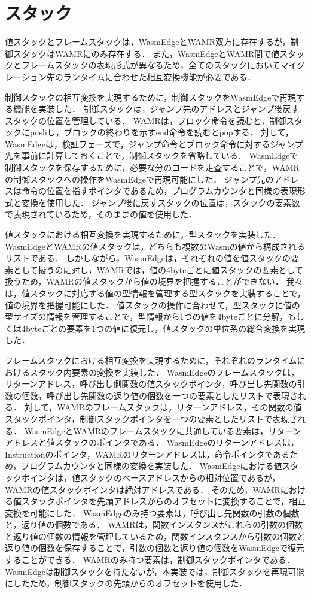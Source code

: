 \section{スタック}
値スタックとフレームスタックは，WasmEdgeとWAMR双方に存在するが，制御スタックはWAMRにのみ存在する．
また，WasmEdgeとWAMR間で値スタックとフレームスタックの表現形式が異なるため，全てのスタックにおいてマイグレーション先のランタイムに合わせた相互変換機能が必要である．

制御スタックの相互変換を実現するために，制御スタックをWasmEdgeで再現する機能を実装した．
制御スタックは，ジャンプ先のアドレスとジャンプ後戻すスタックの位置を管理している．
WAMRは，ブロック命令を読むと，制御スタックにpushし，ブロックの終わりを示すend命令を読むとpopする．
対して，WasmEdgeは，検証フェーズで，ジャンプ命令とブロック命令に対するジャンプ先を事前に計算しておくことで，制御スタックを省略している．
WasmEdgeで制御スタックを保存するために，必要な分のコードを走査することで，WAMRの制御スタックへの操作をWasmEdgeで再現可能にした．
ジャンプ先のアドレスは命令の位置を指すポインタであるため，プログラムカウンタと同様の表現形式と変換を使用した．
ジャンプ後に戻すスタックの位置は，スタックの要素数で表現されているため，そのままの値を使用した．

値スタックにおける相互変換を実現するために，型スタックを実装した．
WasmEdgeとWAMRの値スタックは，どちらも複数のWasmの値から構成されるリストである．
しかしながら，WasmEdgeは，それぞれの値を値スタックの要素として扱うのに対し，WAMRでは，値の4byteごとに値スタックの要素として扱うため，WAMRの値スタックから値の境界を把握することができない．
我々は，値スタックに対応する値の型情報を管理する型スタックを実装することで，値の境界を把握可能にした．
値スタックの操作に合わせて，型スタックに値の型サイズの情報を管理することで，型情報から1つの値を4byteごとに分解，もしくは4byteごとの要素を1つの値に復元し，値スタックの単位系の総合変換を実現した．

フレームスタックにおける相互変換を実現するために，それぞれのランタイムにおけるスタック内要素の変換を実装した．
WasmEdgeのフレームスタックは，リターンアドレス，呼び出し側関数の値スタックポインタ，呼び出し先関数の引数の個数，呼び出し先関数の返り値の個数を一つの要素としたリストで表現される．
対して，WAMRのフレームスタックは，リターンアドレス，その関数の値スタックポインタ，制御スタックポインタを一つの要素としたリストで表現される．
WasmEdgeとWAMRのフレームスタックに共通している要素は，リターンアドレスと値スタックのポインタである．
WasmEdgeのリターンアドレスは，Instructionのポインタ，WAMRのリターンアドレスは，命令ポインタであるため，プログラムカウンタと同様の変換を実装した．
WasmEdgeにおける値スタックポインタは，値スタックのベースアドレスからの相対位置であるが，WAMRの値スタックポインタは絶対アドレスである．
そのため，WAMRにおける値スタックポインタを先頭アドレスからのオフセットに変換することで，相互変換を可能にした．
WasmEdgeのみ持つ要素は，呼び出し先関数の引数の個数と，返り値の個数である．
WAMRは，関数インスタンスがこれらの引数の個数と返り値の個数の情報を管理しているため，関数インスタンスから引数の個数と返り値の個数を保存することで，引数の個数と返り値の個数をWasmEdgeで復元することができる．
WAMRのみ持つ要素は，制御スタックポインタである．
WasmEdgeは制御スタックを持たないが，本実装では，制御スタックを再現可能にしたため，制御スタックの先頭からのオフセットを使用した．
